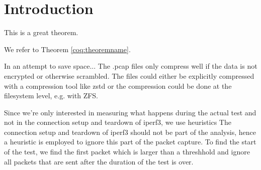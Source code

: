 
\chapter{Introduction}


\begin{theorem}[Test][theoremname]
  This is a great theorem.
\end{theorem}

We refer to Theorem \ref{coq:theoremname}.

In an attempt to save space...
The .pcap files only compress well if the data is not encrypted or otherwise scrambled.
The files could either be explicitly compressed with a compression tool like zstd or the compression could be done at the filesystem level, e.g. with ZFS.


Since we're only interested in measuring what happens during the actual test and not in the connection setup and teardown of iperf3, we use heuristics
The connection setup and teardown of iperf3 should not be part of the analysis, hence a heuristic is employed to ignore this part of the packet capture. To find the start of the test, we find the first packet which is larger than a threshhold and ignore all packets that are sent after the duration of the test is over.

